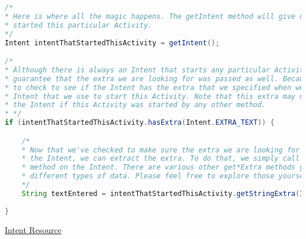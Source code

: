 \documentclass[12pt]{article} %
\begin{document}
\begin{lstlisting}[language=Java]
 /*
* Here is where all the magic happens. The getIntent method will give us the Intent that
* started this particular Activity.
*/
Intent intentThatStartedThisActivity = getIntent();

/*
* Although there is always an Intent that starts any particular Activity, we can't
* guarantee that the extra we are looking for was passed as well. Because of that, we need
* to check to see if the Intent has the extra that we specified when we created the
* Intent that we use to start this Activity. Note that this extra may not be present in
* the Intent if this Activity was started by any other method.
* */
if (intentThatStartedThisActivity.hasExtra(Intent.EXTRA_TEXT)) {

	/*
	* Now that we've checked to make sure the extra we are looking for is contained within
	* the Intent, we can extract the extra. To do that, we simply call the getStringExtra
	* method on the Intent. There are various other get*Extra methods you can call for
	* different types of data. Please feel free to explore those yourself.
	*/
	String textEntered = intentThatStartedThisActivity.getStringExtra(Intent.EXTRA_TEXT);
	
}
\end{lstlisting}

\href{https://developer.android.com/reference/android/content/Intent.html}{Intent Resource}
\end{document}
